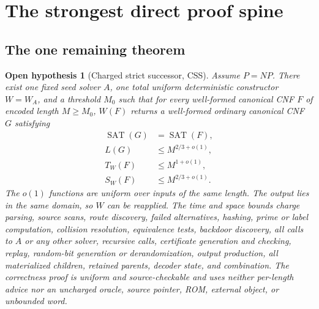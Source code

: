 \documentclass[11pt]{article}
\newtheorem{hypothesis}[theorem]{Open hypothesis}
\newcommand{\SAT}{\operatorname{SAT}}
\begin{document}
\section{The strongest direct proof spine}

\subsection{The one remaining theorem}

\begin{hypothesis}[Charged strict successor, CSS]
\label{hyp:css}
Assume $P=NP$.  There exist one fixed seed solver $A$, one total uniform
deterministic constructor $W=W_A$, and a threshold $M_0$ such that for every
well-formed canonical CNF $F$ of encoded length $M\ge M_0$, $W(F)$ returns a
well-formed ordinary canonical CNF $G$ satisfying
\begin{align}
 \SAT(G)&=\SAT(F),                                      \label{eq:css-sem}\\
 L(G)&\le M^{2/3+o(1)},                                \label{eq:css-size}\\
 T_W(F)&\le M^{1+o(1)},                                \label{eq:css-time}\\
 S_W(F)&\le M^{2/3+o(1)}.                              \label{eq:css-space}
\end{align}
The $o(1)$ functions are uniform over inputs of the same length.  The output
lies in the same domain, so $W$ can be reapplied.  The time and space bounds
charge parsing, source scans, route discovery, failed alternatives, hashing,
prime or label computation, collision resolution, equivalence tests,
backdoor discovery, all calls to $A$ or any other solver, recursive calls,
certificate generation and checking, replay, random-bit generation or
derandomization, output production, all materialized children, retained
parents, decoder state, and combination.  The correctness proof is uniform
and source-checkable and uses neither per-length advice nor an uncharged
oracle, source pointer, ROM, external object, or unbounded word.
\end{hypothesis}
\end{document}

